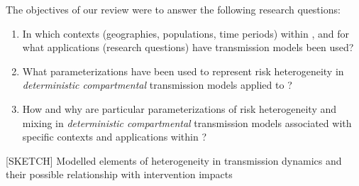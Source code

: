 \par


\par
[OLD]
The objectives of our review were to answer the following research questions:
\begin{enumerate}
  \item\label{q:context}
  In which contexts (geographies, populations, time periods)
  within \ssa, and
  for what applications (research questions)
  have \hiv transmission models been used?
  \item\label{q:hetero}
  What parameterizations have been used
  to represent risk heterogeneity
  in \emph{deterministic compartmental} \hiv transmission models
  applied to \ssa?
  \item\label{q:trends}
  How and why are particular parameterizations of risk heterogeneity and mixing
  in \emph{deterministic compartmental} \hiv transmission models
  associated with specific contexts and applications within \ssa?
\end{enumerate}

\begin{table}
  \centering
  \caption{[SKETCH] Modelled elements of heterogeneity in transmission dynamics
    and their possible relationship with intervention impacts}
  
  \label{tab:het-vs-int}
\end{table}

